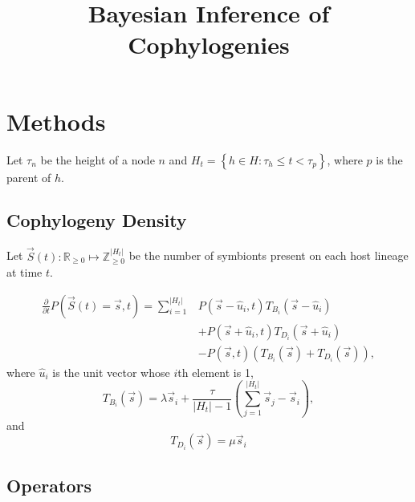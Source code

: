 \documentclass{article}
\title{Bayesian Inference of Cophylogenies}
\begin{document}
    \section*{Methods}

        Let $\tau_n$ be the height of a node $n$ and $H_t = \left\{h \in H:
        \tau_h \leq t < \tau_p\right\}$, where $p$ is the parent of $h$.

        \subsection*{Cophylogeny Density}

            Let $\vec{S}\left(t\right) : \mathbb{R}_{\geq 0} \mapsto
            \mathbb{Z}_{\geq 0}^{\lvert{H_t}\rvert}$ be the number of symbionts
            present on each host lineage at time $t$.

            \begin{equation}
                \begin{split}
                    \frac{\partial}{\partial t} P\left(\vec{S}\left(t\right) =
                    \vec{s},t\right) = \sum_{i=1}^{\lvert{H_t}\rvert}
                    &P\left(\vec{s} - \hat{u}_i, t\right)T_{B_i}\left(\vec{s} -
                    \hat{u}_i\right) \\ &+ P\left(\vec{s} + \hat{u}_i,
                    t\right)T_{D_i}\left(\vec{s} + \hat{u}_i \right) \\ &-
                    P\left(\vec{s}, t\right)\left(T_{B_i}\left(\vec{s}\right) +
                    T_{D_i}\left(\vec{s} \right)\right),
                \end{split}
            \end{equation}
            where $\hat{u}_i$ is the unit vector whose $i$th element is 1,
            \begin{equation}
                T_{B_i}\left(\vec{s}\right) = \lambda \vec{s}_i +
                \frac{\tau}{\lvert{H_t}\rvert - 1}
                \left(\sum_{j=1}^{\lvert{H_t}\rvert}
                {\vec{s}_j}-\vec{s}_i\right),
            \end{equation}
            and
            \begin{equation}
                T_{D_i}\left(\vec{s}\right) = \mu \vec{s}_i
            \end{equation}

        \subsection*{Operators}
\end{document}
